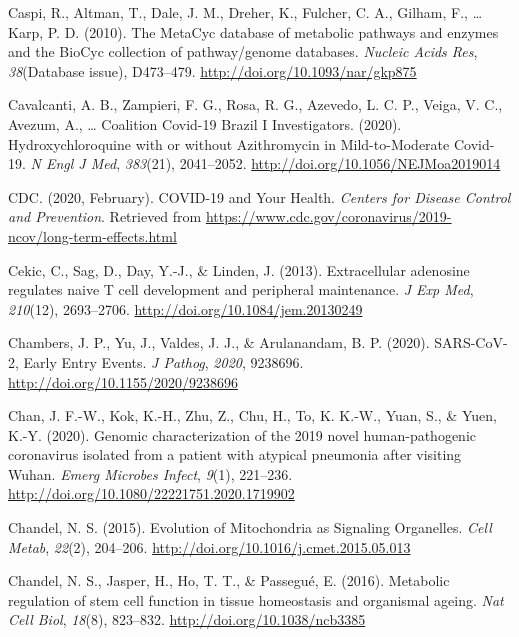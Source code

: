 \documentclass[12pt,twoside,openany,\mydriver]{thesis}  %
\begin{document}
\leavevmode\hypertarget{ref-caspi_metacyc_2010}{}%
Caspi, R., Altman, T., Dale, J. M., Dreher, K., Fulcher, C. A., Gilham, F., \ldots{} Karp, P. D. (2010). The MetaCyc database of metabolic pathways and enzymes and the BioCyc collection of pathway/genome databases. \emph{Nucleic Acids Res}, \emph{38}(Database issue), D473--479. \url{http://doi.org/10.1093/nar/gkp875}

\leavevmode\hypertarget{ref-cavalcanti_hydroxychloroquine_2020}{}%
Cavalcanti, A. B., Zampieri, F. G., Rosa, R. G., Azevedo, L. C. P., Veiga, V. C., Avezum, A., \ldots{} Coalition Covid-19 Brazil I Investigators. (2020). Hydroxychloroquine with or without Azithromycin in Mild-to-Moderate Covid-19. \emph{N Engl J Med}, \emph{383}(21), 2041--2052. \url{http://doi.org/10.1056/NEJMoa2019014}

\leavevmode\hypertarget{ref-cdc_covid-19_2020}{}%
CDC. (2020, February). COVID-19 and Your Health. \emph{Centers for Disease Control and Prevention}. Retrieved from \url{https://www.cdc.gov/coronavirus/2019-ncov/long-term-effects.html}

\leavevmode\hypertarget{ref-cekic_extracellular_2013}{}%
Cekic, C., Sag, D., Day, Y.-J., \& Linden, J. (2013). Extracellular adenosine regulates naive T cell development and peripheral maintenance. \emph{J Exp Med}, \emph{210}(12), 2693--2706. \url{http://doi.org/10.1084/jem.20130249}

\leavevmode\hypertarget{ref-chambers_sars-cov-2_2020}{}%
Chambers, J. P., Yu, J., Valdes, J. J., \& Arulanandam, B. P. (2020). SARS-CoV-2, Early Entry Events. \emph{J Pathog}, \emph{2020}, 9238696. \url{http://doi.org/10.1155/2020/9238696}

\leavevmode\hypertarget{ref-chan_genomic_2020}{}%
Chan, J. F.-W., Kok, K.-H., Zhu, Z., Chu, H., To, K. K.-W., Yuan, S., \& Yuen, K.-Y. (2020). Genomic characterization of the 2019 novel human-pathogenic coronavirus isolated from a patient with atypical pneumonia after visiting Wuhan. \emph{Emerg Microbes Infect}, \emph{9}(1), 221--236. \url{http://doi.org/10.1080/22221751.2020.1719902}

\leavevmode\hypertarget{ref-chandel_evolution_2015}{}%
Chandel, N. S. (2015). Evolution of Mitochondria as Signaling Organelles. \emph{Cell Metab}, \emph{22}(2), 204--206. \url{http://doi.org/10.1016/j.cmet.2015.05.013}

\leavevmode\hypertarget{ref-chandel_metabolic_2016}{}%
Chandel, N. S., Jasper, H., Ho, T. T., \& Passegué, E. (2016). Metabolic regulation of stem cell function in tissue homeostasis and organismal ageing. \emph{Nat Cell Biol}, \emph{18}(8), 823--832. \url{http://doi.org/10.1038/ncb3385}
\end{document}
